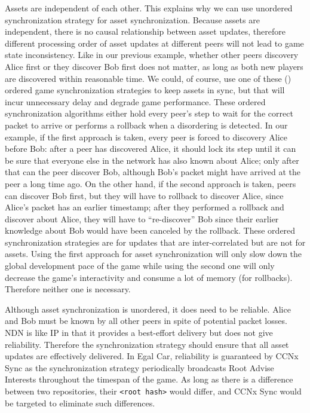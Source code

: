 \documentclass{article}
\begin{document}
Assets are independent of each other. This explains why we can use unordered synchronization strategy for asset synchronization. Because assets are independent, there is no causal relationship between asset updates, therefore different processing order of asset updates at different peers will not lead to game state inconsistency. Like in our previous example, whether other peers discovery Alice first or they discover Bob first does not matter, as long as both new players are discovered within reasonable time. We could, of course, use one of these (\cite{Chandy, Bryant, Flockstep, Csync, Doptbkt}) ordered game synchronization strategies to keep assets in sync, but that will incur unnecessary delay and degrade game performance. These ordered synchronization algorithms either hold every peer's step to wait for the correct packet to arrive or performs a rollback when a disordering is detected. In our example, if the first approach is taken, every peer is forced to discovery Alice before Bob: after a peer has discovered Alice, it should lock its step until it can be sure that everyone else in the network has also known about Alice; only after that can the peer discover Bob, although Bob's packet might have arrived at the peer a long time ago. On the other hand, if the second approach is taken, peers can discover Bob first, but they will have to rollback to discover Alice, since Alice's packet has an earlier timestamp; after they performed a rollback and discover about Alice, they will have to ``re-discover'' Bob since their earlier knowledge about Bob would have been canceled by the rollback. These ordered synchronization strategies are for updates that are inter-correlated but are not for assets. Using the first approach for asset synchronization will only slow down the global development pace of the game while using the second one will only decrease the game's interactivity and consume a lot of memory (for rollbacks). Therefore neither one is necessary.

Although asset synchronization is unordered, it does need to be reliable. Alice and Bob must be known by all other peers in spite of potential packet losses. NDN is like IP in that it provides a best-effort delivery but does not give reliability. Therefore the synchronization strategy should ensure that all asset updates are effectively delivered. In Egal Car, reliability is guaranteed by CCNx Sync as the synchronization strategy periodically broadcasts Root Advise Interests throughout the timespan of the game. As long as there is a difference between two repositories, their \texttt{<root hash>} would differ, and CCNx Sync would be targeted to eliminate such differences.
\end{document}

